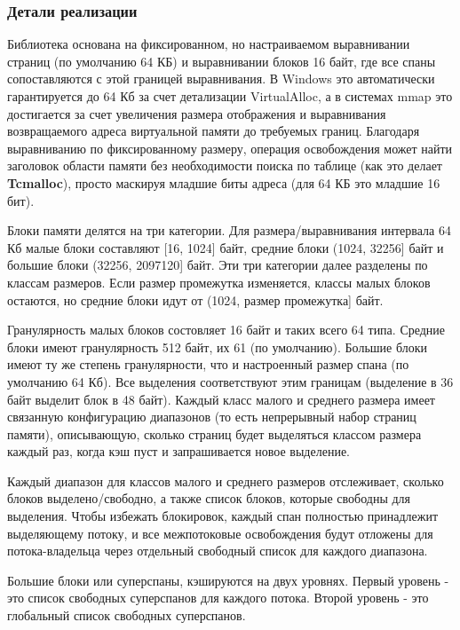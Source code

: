 \subsubsection{Детали реализации}

Библиотека основана на фиксированном, но настраиваемом выравнивании страниц (по умолчанию 64 КБ) и выравнивании блоков 16 байт, где все спаны сопоставляются с этой границей выравнивания. В Windows это автоматически гарантируется до 64 Кб за счет детализации VirtualAlloc, а в системах mmap это достигается за счет увеличения размера отображения и выравнивания возвращаемого адреса виртуальной памяти до требуемых границ. Благодаря выравниванию по фиксированному размеру, операция освобождения может найти заголовок области памяти без необходимости поиска по таблице (как это делает \textbf{Tcmalloc}), просто маскируя младшие биты адреса (для 64 КБ это младшие 16 бит).

Блоки памяти делятся на три категории. Для размера/выравнивания интервала 64 Кб малые блоки составляют [16, 1024] байт, средние блоки (1024, 32256] байт и большие блоки (32256, 2097120] байт. Эти три категории далее разделены по классам размеров. Если размер промежутка изменяется, классы малых блоков остаются, но средние блоки идут от (1024, размер промежутка] байт.

Гранулярность малых блоков состовляет 16 байт и таких всего 64 типа. Средние блоки имеют гранулярность 512 байт, их 61 (по умолчанию). Большие блоки имеют ту же степень гранулярности, что и настроенный размер спана (по умолчанию 64 Кб). Все выделения соответствуют этим границам (выделение в 36 байт выделит блок в 48 байт). Каждый класс малого и среднего размера имеет связанную конфигурацию диапазонов (то есть непрерывный набор страниц памяти), описывающую, сколько страниц будет выделяться классом размера каждый раз, когда кэш пуст и запрашивается новое выделение.

Каждый диапазон для классов малого и среднего размеров отслеживает, сколько блоков выделено/свободно, а также список блоков, которые свободны для выделения. Чтобы избежать блокировок, каждый спан полностью принадлежит выделяющему потоку, и все межпотоковые освобождения будут отложены для потока-владельца через отдельный свободный список для каждого диапазона.

Большие блоки или суперспаны, кэшируются на двух уровнях. Первый уровень - это список свободных суперспанов для каждого потока. Второй уровень - это глобальный список свободных суперспанов.


